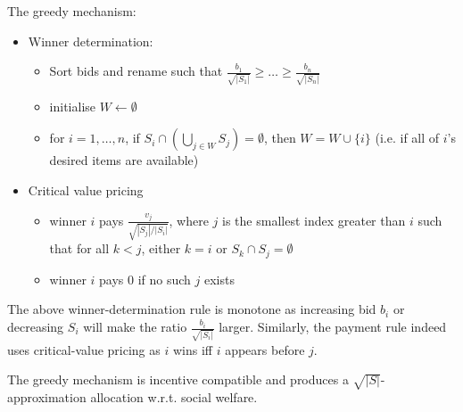 			The greedy mechanism:
			\begin{itemize}
				\item Winner determination:
				\begin{itemize}
						\item Sort bids and rename such that
							$\frac{b_1}{\sqrt{|S_1|}} \ge \ldots \ge
							\frac{b_n}{\sqrt{|S_n|}}$
						\item initialise $W \leftarrow \emptyset$
						\item for $i = 1, \ldots, n$, if $S_i \cap (\bigcup_{j \in W} S_j)
							= \emptyset$, then $W = W \cup \{i\}$ (i.e. if all
							of $i$'s desired items are available)
				\end{itemize}
			\item Critical value pricing
				\begin{itemize}
					\item winner $i$ pays $\frac{v_j}{\sqrt{|S_j|/|S_i|}}$,
						where $j$ is the smallest index greater than $i$ such
						that for all $k < j$, either $k=i$ or $S_k \cap S_j =
						\emptyset$
					\item winner $i$ pays 0 if no such $j$ exists
				\end{itemize}
			\end{itemize}

			The above winner-determination rule is monotone as increasing bid
			$b_i$ or decreasing $S_i$ will make the ratio
			$\frac{b_i}{\sqrt{|S_i|}}$ larger. Similarly, the payment rule
			indeed uses critical-value pricing as $i$ wins iff $i$ appears
			before $j$.

			\begin{theorem}
				The greedy mechanism is incentive compatible and produces a
				$\sqrt{|S|}$-approximation allocation w.r.t. social welfare.
			\end{theorem}

